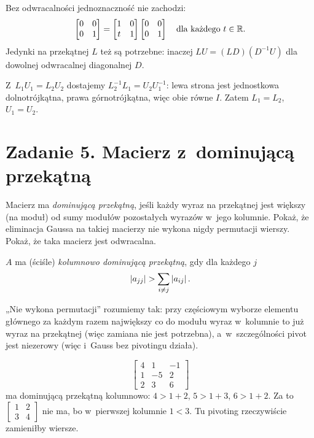 \documentclass[11pt]{article}
\begin{document}
\begin{uwaga}
Bez odwracalności jednoznaczność nie zachodzi:
\[
\begin{bmatrix}0&0\\0&1\end{bmatrix}
=\begin{bmatrix}1&0\\t&1\end{bmatrix}
\begin{bmatrix}0&0\\0&1\end{bmatrix}
\quad\text{dla każdego }t\in\mathbb{R}.
\]
Jedynki na przekątnej $L$ też są potrzebne: inaczej
$LU=(LD)(D^{-1}U)$ dla dowolnej odwracalnej diagonalnej $D$.
\end{uwaga}

\begin{odpowiedz}
Z~$L_1U_1=L_2U_2$ dostajemy $L_2^{-1}L_1=U_2U_1^{-1}$: lewa strona jest
jednostkowa dolnotrójkątna, prawa górnotrójkątna, więc obie równe $I$.
Zatem $L_1=L_2$, $U_1=U_2$.
\end{odpowiedz}

\section{Zadanie 5. Macierz z~dominującą przekątną}
\begin{tresc}
Macierz ma \emph{dominującą przekątną}, jeśli każdy wyraz na przekątnej
jest większy (na moduł) od sumy modułów pozostałych wyrazów w~jego kolumnie.
Pokaż, że eliminacja Gaussa na takiej macierzy nie wykona nigdy permutacji
wierszy. Pokaż, że taka macierz jest odwracalna.
\end{tresc}

\begin{teoria}
\begin{definicja}
$A$ ma (ściśle) \emph{kolumnowo dominującą przekątną}, gdy dla każdego $j$
\[
\left\lvert a_{jj} \right\rvert>\sum_{i\ne j}\left\lvert a_{ij} \right\rvert.
\]
\end{definicja}
„Nie wykona permutacji” rozumiemy tak: przy częściowym wyborze elementu
głównego za każdym razem największy co do modułu wyraz w~kolumnie to już
wyraz na przekątnej (więc zamiana nie jest potrzebna), a~w~szczególności
pivot jest niezerowy (więc i~Gauss bez pivotingu działa).
\end{teoria}

\begin{przyklad}
\[
\begin{bmatrix}4&1&-1\\1&-5&2\\2&3&6\end{bmatrix}
\]
ma dominującą przekątną kolumnowo: $4>1+2$, $5>1+3$, $6>1+2$. Za to
$\left[\begin{smallmatrix}1&2\\3&4\end{smallmatrix}\right]$ nie ma, bo
w~pierwszej kolumnie $1<3$. Tu pivoting rzeczywiście zamieniłby wiersze.
\end{przyklad}
\end{document}
